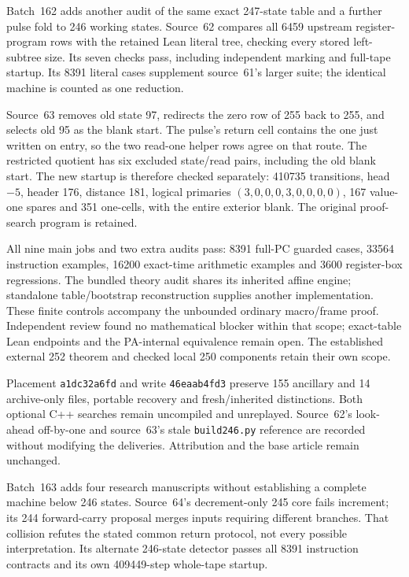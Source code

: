 \documentclass[11pt]{article}
\begin{document}
{Batch~162 adds another audit of the same exact 247-state table and a further
pulse fold to 246 working states. Source~62 compares all 6459 upstream
register-program rows with the retained Lean literal tree, checking every
stored left-subtree size. Its seven checks pass, including independent
marking and full-tape startup. Its 8391 literal cases supplement source~61's
larger suite; the identical machine is counted as one reduction.

Source~63 removes old state 97, redirects the zero row of 255 back to 255,
and selects old 95 as the blank start. The pulse's return cell contains the
one just written on entry, so the two read-one helper rows agree on that
route. The restricted quotient has six excluded state/read pairs, including
the old blank start. The new startup is therefore checked separately:
410735 transitions, head $-5$, header 176, distance 181, logical primaries
$(3,0,0,0,3,0,0,0,0)$, 167 value-one spares and 351 one-cells, with the
entire exterior blank. The original proof-search program is retained.

All nine main jobs and two extra audits pass: 8391 full-PC guarded cases,
33564 instruction examples, 16200 exact-time arithmetic examples and
3600 register-box regressions. The bundled theory audit shares its inherited
affine engine; standalone table/bootstrap reconstruction supplies another
implementation. These finite controls accompany the unbounded ordinary
macro/frame proof. Independent review found no mathematical blocker within
that scope; exact-table Lean endpoints and the PA-internal equivalence remain
open. The established external 252 theorem and checked local 250 components
retain their own scope.

Placement \texttt{a1dc32a6fd} and write \texttt{46eaab4fd3} preserve 155 ancillary
and 14 archive-only files, portable recovery and fresh/inherited distinctions.
Both optional C++ searches remain uncompiled and unreplayed. Source~62's
look-ahead off-by-one and source~63's stale \texttt{build246.py} reference are
recorded without modifying the deliveries. Attribution and the base article
remain unchanged.

Batch~163 adds four research manuscripts without establishing a complete
machine below 246 states. Source~64's decrement-only 245 core fails increment;
its 244 forward-carry proposal merges inputs requiring different branches.
That collision refutes the stated common return protocol, not every possible
interpretation. Its alternate 246-state detector passes all 8391 instruction
contracts and its own 409449-step whole-tape startup.

}
\end{document}
